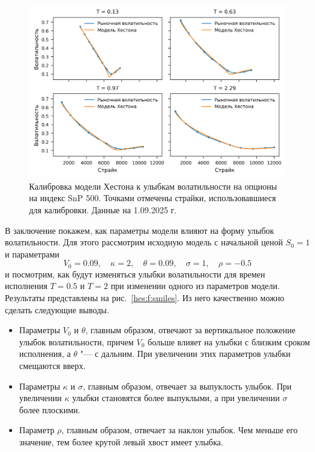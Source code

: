 \begin{figure}[h]
\centering
\includegraphics{pic/heston-calibration.png}
\caption{Калибровка модели Хестона к улыбкам волатильности на опционы на индекс SnP 500.
Точками отмечены страйки, использовавшиеся для калибровки.
Данные на 1.09.2025 г.}
\label{hes:f:calibration}
\end{figure}

В заключение покажем, как параметры модели влияют на форму улыбок волатильности.
Для этого рассмотрим исходную модель с начальной ценой $S_0=1$ и параметрами
\[
V_0=0.09, \quad \kappa=2, \quad \theta=0.09,\quad  \sigma=1, \quad \rho=-0.5
\]
и посмотрим, как будут изменяться улыбки волатильности для времен исполнения $T=0.5$ и $T=2$ при изменении одного из параметров модели.
Результаты представлены на рис.~\ref{hes:f:smiles}.
Из него качественно можно сделать следующие выводы.
\begin{itemize}
\item Параметры $V_0$ и $\theta$, главным образом, отвечают за вертикальное положение улыбок волатильности, причем  $V_0$ больше влияет на улыбки с близким сроком исполнения, а $\theta$ "--- с дальним.
При увеличении этих параметров улыбки смещаются вверх.
\item Параметры $\kappa$ и $\sigma$, главным образом,  отвечает за выпуклость улыбок.
При увеличении $\kappa$ улыбки становятся более выпуклыми, а при увеличении $\sigma$ более плоскими.
\item Параметр $\rho$, главным образом, отвечает за наклон улыбок. Чем меньше его значение, тем более крутой левый хвост имеет улыбка. 
\end{itemize}

